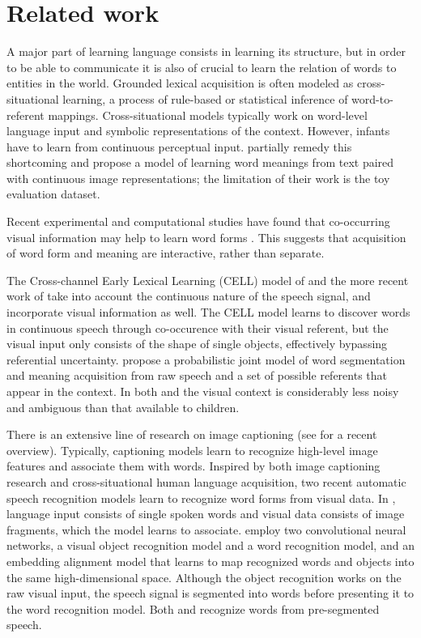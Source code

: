\section{Related work}
A major part of learning language consists in learning its structure,
but in order to be able to communicate it is also of crucial
to learn the relation of words to entities in the
world.
Grounded lexical acquisition is often modeled as cross-situational
learning, a process of rule-based \cite{siskind.96} or statistical
\cite{fazly.etal.10csj,frank.etal.07} inference of word-to-referent
mappings.
Cross-situational models typically work on word-level language input
and symbolic representations of the context. However, infants have to
learn from continuous perceptual input. 
 partially remedy this shortcoming
and propose a model of learning word
meanings from text paired with continuous image representations; the
limitation of their work is the toy evaluation dataset.

Recent experimental and computational studies have found that co-occurring visual information may help to learn word forms \cite{thiessen2010effects,Cunillera2010295,Glicksohn2013,Yurofsky2012statistical}. This suggests that acquisition of word form and meaning are interactive, rather than separate.

The Cross-channel Early Lexical Learning (CELL) model of  and the more recent work of  take into account the continuous nature of the speech signal, and incorporate visual information as well. The CELL model learns to discover words in continuous speech through co-occurence with their visual referent, but the visual input only consists of the shape of single objects, effectively bypassing referential uncertainty.  propose a probabilistic joint model of word segmentation and meaning acquisition from raw speech and a set of possible referents that appear in the context. In both  and  the visual context is considerably less noisy and ambiguous than that available to children.

There is an extensive line of research on image captioning (see  for a recent overview). Typically, captioning models learn to recognize high-level image features and associate them with words. Inspired by both image captioning research and cross-situational human language acquisition, two recent automatic speech recognition models learn to recognize word forms from visual data. In , language input consists of single spoken words and visual data consists of image fragments, which the model learns to associate.  employ two convolutional neural networks, a visual object recognition model and a word recognition model, and an embedding alignment model that learns to map recognized words and objects into the same high-dimensional space. Although the object recognition works on the raw visual input, the speech signal is segmented into words before presenting it to the word recognition model. Both  and  recognize words from pre-segmented speech.

